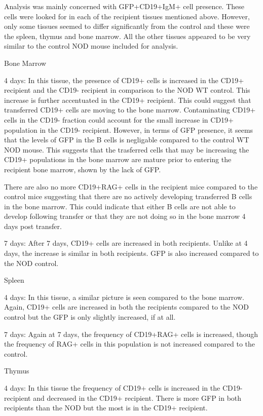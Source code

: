 Analysis was mainly concerned with GFP+CD19+IgM+ cell presence.
These cells were looked for in each of the recipient tissues mentioned above.
However, only some tissues seemed to differ significantly from the control and these were the spleen, thymus and bone marrow.
All the other tissues appeared to be very similar to the control NOD mouse included for analysis.

Bone Marrow

4 days:
In this tissue, the presence of CD19+ cells is increased in the CD19+ recipient and the CD19- recipient in comparison to the NOD WT control.
This increase is further accentuated in the CD19+ recipient.
This could suggest that transferred CD19+ cells are moving to the bone marrow.
Contaminating CD19+ cells in the CD19- fraction could account for the small increase in CD19+ population in the CD19- recipient.
However, in terms of GFP presence, it seems that the levels of GFP in the B cells is negligable compared to the control WT NOD mouse.
This suggests that the trasferred cells that may be increasing the CD19+ populations in the bone marrow are mature prior to entering the recipient bone marrow, shown by the lack of GFP.

There are also no more CD19+RAG+ cells in the recipient mice compared to the control mice suggesting that there are no actively developing transferred B cells in the bone marrow.
This could indicate that either B cells are not able to develop following transfer or that they are not doing so in the bone marrow 4 days post transfer.

7 days:
After 7 days, CD19+ cells are increased in both recipients. 
Unlike at 4 days, the increase is similar in both recipients.
GFP is also increased compared to the NOD control.

Spleen

4 days:
In this tissue, a similar picture is seen compared to the bone marrow. 
Again, CD19+ cells are increased in both the recipients compared to the NOD control but the GFP is only slightly increased, if at all.

7 days:
Again at 7 days, the frequency of CD19+RAG+ cells is increased, though the frequency of RAG+ cells in this population is not increased compared to the control.


Thymus

4 days:
In this tissue the frequency of CD19+ cells is increased in the CD19- recipient and decreased in the CD19+ recipient.
There is more GFP in both recipients than the NOD but the most is in the CD19+ recipient.

